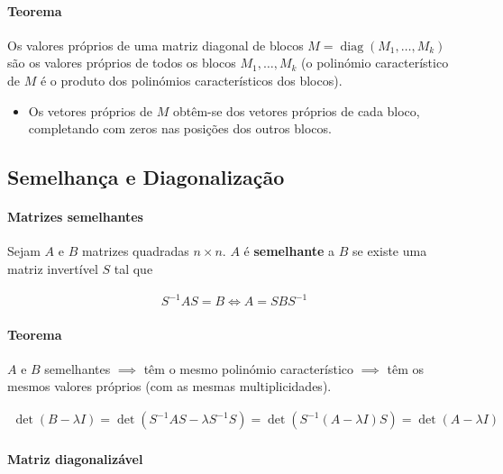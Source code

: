\documentclass{article}
\begin{document}
\paragraph{Teorema}

Os valores próprios de uma matriz diagonal de blocos $M = \operatorname{diag}(M_1, \ldots, M_k)$ são os
valores próprios de todos os blocos $M_1, \ldots, M_k$ (o polinómio característico de $M$ é o produto dos
polinómios característicos dos blocos).

\begin{itemize}
    \item Os vetores próprios de $M$ obtêm-se dos vetores próprios de cada bloco, completando com zeros nas
    posições dos outros blocos.
\end{itemize}

\bigskip

\subsection{Semelhança e Diagonalização}

\paragraph{Matrizes semelhantes}

Sejam $A$ e $B$ matrizes quadradas $n \times n$. $A$ é \textbf{semelhante} a $B$ se existe uma matriz
invertível $S$ tal que

\begin{gather*}
S^{-1} A S = B \Leftrightarrow A = S B S^{-1}
\end{gather*}

\paragraph{Teorema}

$A$ e $B$ semelhantes $\implies$ têm o mesmo polinómio característico $\implies$ têm os mesmos valores
próprios (com as mesmas multiplicidades).

\begin{gather*}
\det(B - \lambda I) = \det(S^{-1} A S - \lambda S^{-1} S) = \det\left( S^{-1} (A - \lambda I) S \right)
= \det(A - \lambda I)
\end{gather*}

\paragraph{Matriz diagonalizável}
\end{document}
